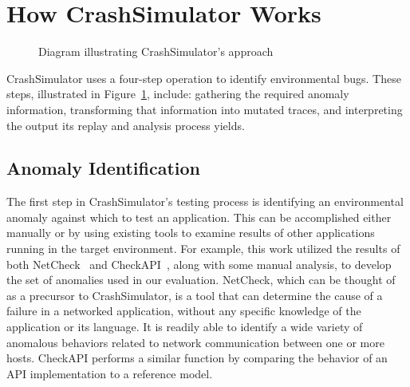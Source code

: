 \section{How CrashSimulator Works}
\label{SEC:approach}

\begin{figure}[t]
  \center{}
  \caption{Diagram illustrating CrashSimulator's approach}
  \label{figure:approach}
\end{figure}

CrashSimulator uses a four-step operation to identify environmental bugs.
These steps, illustrated in Figure~\ref{figure:approach}, include:
gathering the required anomaly information, transforming that information
into mutated traces, and interpreting  the output its replay and analysis
process yields.


\subsection{Anomaly Identification} \label{subsec:anomalyidentification}

The first step in CrashSimulator's testing process is identifying an
environmental anomaly against which to test an application.  This can be
accomplished either manually or by using existing tools to examine results
of other applications
running in the target environment.  For example, this
work utilized the results of both NetCheck~\cite{Zhuang_NSDI_2014} and
CheckAPI~\cite{rasley2015detecting}, along with some
manual analysis, to develop
the set of anomalies used in our evaluation.  NetCheck, which can be
thought of as a precursor to CrashSimulator, is a tool that can determine
the cause of a failure in a networked application, without any specific
knowledge of the application or its language. It is readily able to
identify a wide variety of anomalous behaviors related to network
communication between one or more hosts.  CheckAPI performs a similar
function by comparing the behavior of an API implementation to a reference
model.

